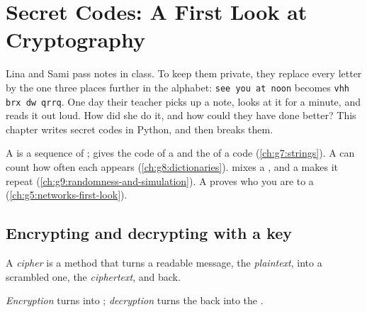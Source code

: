 \chapter{Secret Codes: A First Look at Cryptography}\label{ch:g9:first-cryptography}

Lina and Sami pass notes in class. To keep them private, they replace every
letter by the one three places further in the alphabet: \texttt{see you at
noon} becomes \texttt{vhh brx dw qrrq}. One day their teacher picks up a note,
looks at it for a minute, and reads it out loud. How did she do it, and how
could they have done better? This chapter writes secret codes in Python, and
then breaks them.

\begin{recall}
A  is a sequence of ;  gives the code of a 
and  the  of a code (\cref{ch:g7:strings}). A  can
count how often each  appears (\cref{ch:g8:dictionaries}).
 mixes a , and a  makes it repeat
(\cref{ch:g9:randomness-and-simulation}). A  proves who you are to a
 (\cref{ch:g5:networks-first-look}).
\end{recall}

\section{Encrypting and decrypting with a key}

\begin{definition}\label{def:g9:first-cryptography:cipher}
A \emph{cipher} is a method that turns a readable message, the
\emph{plaintext}, into a scrambled one, the
\emph{ciphertext}, and back.
\end{definition}

\begin{definition}\label{def:g9:first-cryptography:encryption}
\emph{Encryption} turns  into ;
\emph{decryption} turns the  back into the
.
\end{definition}


